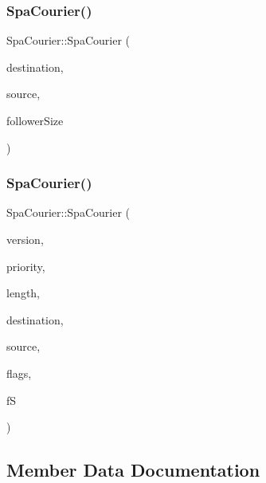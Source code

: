 \subsubsection{\texorpdfstring{Spa\+Courier()}{SpaCourier()}\hspace{0.1cm}{\footnotesize\ttfamily [1/2]}}
{\footnotesize\ttfamily Spa\+Courier\+::\+Spa\+Courier (\begin{DoxyParamCaption}\item[{\hyperlink{structLogicalAddress}{Logical\+Address}}]{destination,  }\item[{\hyperlink{structLogicalAddress}{Logical\+Address}}]{source,  }\item[{ssize\+\_\+t}]{follower\+Size }\end{DoxyParamCaption})\hspace{0.3cm}{\ttfamily [inline]}}

\mbox{\label{structSpaCourier_ac773f210ab350c0e8557c67cbc1b3971}} 
\subsubsection{\texorpdfstring{Spa\+Courier()}{SpaCourier()}\hspace{0.1cm}{\footnotesize\ttfamily [2/2]}}
{\footnotesize\ttfamily Spa\+Courier\+::\+Spa\+Courier (\begin{DoxyParamCaption}\item[{uint8\+\_\+t}]{version,  }\item[{uint8\+\_\+t}]{priority,  }\item[{uint16\+\_\+t}]{length,  }\item[{\hyperlink{structLogicalAddress}{Logical\+Address}}]{destination,  }\item[{\hyperlink{structLogicalAddress}{Logical\+Address}}]{source,  }\item[{uint16\+\_\+t}]{flags,  }\item[{ssize\+\_\+t}]{fS }\end{DoxyParamCaption})\hspace{0.3cm}{\ttfamily [inline]}}



\subsection{Member Data Documentation}
\mbox{\label{structSpaCourier_a0a96d2328c68554838cc1e736181dfd1}} 

